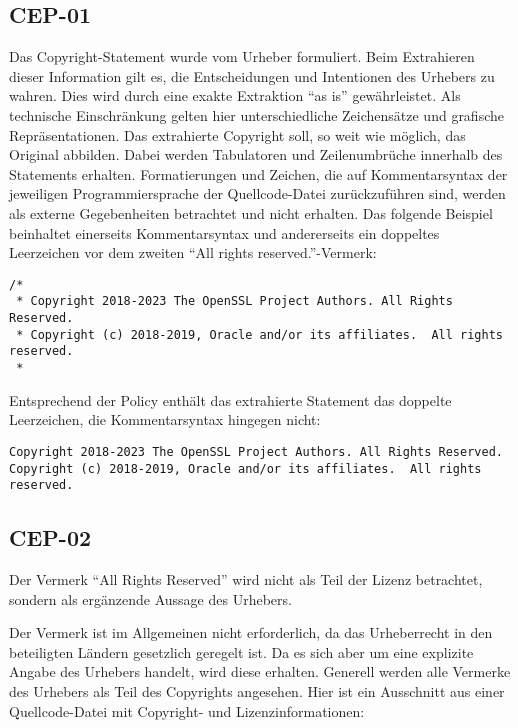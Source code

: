\subsection{CEP-01}\label{subsec:cep-01}

Das Copyright-Statement wurde vom Urheber formuliert.
Beim Extrahieren dieser Information gilt es, die Entscheidungen und Intentionen des Urhebers zu wahren.
Dies wird durch eine exakte Extraktion \enquote{as is} gewährleistet.
Als technische Einschränkung gelten hier unterschiedliche Zeichensätze und grafische Repräsentationen.
Das extrahierte Copyright soll, so weit wie möglich, das Original abbilden.
Dabei werden Tabulatoren und Zeilenumbrüche innerhalb des Statements erhalten.
Formatierungen und Zeichen, die auf Kommentarsyntax der jeweiligen Programmiersprache der Quellcode-Datei zurückzuführen sind, werden als externe Gegebenheiten betrachtet und nicht erhalten.
Das folgende Beispiel beinhaltet einerseits Kommentarsyntax und andererseits ein doppeltes Leerzeichen vor dem zweiten \enquote{All rights reserved.}-Vermerk:

\begin{lstlisting}[keepspaces=true]
/*
 * Copyright 2018-2023 The OpenSSL Project Authors. All Rights Reserved.
 * Copyright (c) 2018-2019, Oracle and/or its affiliates.  All rights reserved.
 *
\end{lstlisting}

Entsprechend der Policy enthält das extrahierte Statement das doppelte Leerzeichen, die Kommentarsyntax hingegen nicht:
\begin{lstlisting}[keepspaces=true]
Copyright 2018-2023 The OpenSSL Project Authors. All Rights Reserved.
Copyright (c) 2018-2019, Oracle and/or its affiliates.  All rights reserved.
\end{lstlisting}


\subsection{CEP-02}\label{subsec:cep-02}

Der Vermerk \enquote{All Rights Reserved} wird nicht als Teil der Lizenz betrachtet, sondern als ergänzende Aussage des Urhebers.

Der Vermerk ist im Allgemeinen nicht erforderlich, da das Urheberrecht in den beteiligten Ländern gesetzlich geregelt ist.
Da es sich aber um eine explizite Angabe des Urhebers handelt, wird diese erhalten.
Generell werden alle Vermerke des Urhebers als Teil des Copyrights angesehen.
Hier ist ein Ausschnitt aus einer Quellcode-Datei mit Copyright- und Lizenzinformationen:

